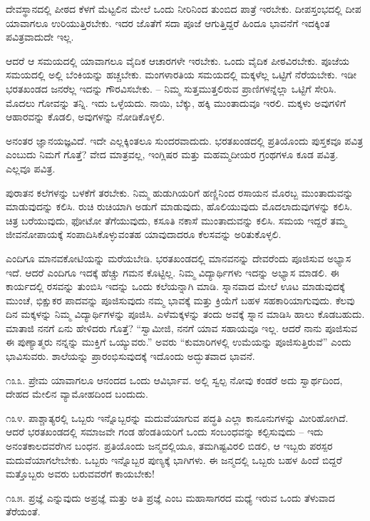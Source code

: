 ದೇವಸ್ಥಾನದಲ್ಲಿ ಪೀಠದ ಕೆಳಗೆ ಮೆಟ್ಟಲಿನ ಮೇಲೆ ಒಂದು ನೀರಿನಿಂದ ತುಂಬಿದ ಪಾತ್ರೆ ಇರಬೇಕು. ದೀಪಸ್ತಂಭದಲ್ಲಿ ದೀಪ ಯಾವಾಗಲೂ ಉರಿಯುತ್ತಿರಬೇಕು. ಇದರ ಜೊತೆಗೆ ಸದಾ ಪೂಜೆ ಆಗುತ್ತಿದ್ದರೆ ಹಿಂದೂ ಭಾವನೆಗೆ ಇದಕ್ಕಿಂತ ಪವಿತ್ರವಾದುದೇ ಇಲ್ಲ.

ಆದರೆ ಆ ಸಮಯದಲ್ಲಿ ಯಾವಾಗಲೂ ವೈದಿಕ ಆಚಾರಗಳೇ ಇರಬೇಕು. ಒಂದು ವೈದಿಕ ಪೀಠವಿರಬೇಕು. ಪೂಜೆಯ ಸಮಯದಲ್ಲಿ ಅಲ್ಲಿ ಬೆಂಕಿಯನ್ನು ಹಚ್ಚಬೇಕು. ಮಂಗಳಾರತಿಯ ಸಮಯದಲ್ಲಿ ಮಕ್ಕಳೆಲ್ಲ ಒಟ್ಟಿಗೆ ನೆರೆಯಬೇಕು. ಇಡೀ ಭರತಖಂಡದ ಜನರೆಲ್ಲ ಇದನ್ನು ಗೌರವಿಸಬೇಕು. – ನಿಮ್ಮ ಸುತ್ತಮುತ್ತಲಿರುವ ಪ್ರಾಣಿಗಳನ್ನೆಲ್ಲಾ ಒಟ್ಟಿಗೆ ಸೇರಿಸಿ. ಮೊದಲು ಗೋವನ್ನು ತನ್ನಿ. ಇದು ಒಳ್ಳೆಯದು. ನಾಯಿ, ಬೆಕ್ಕು, ಹಕ್ಕಿ ಮುಂತಾದುವೂ ಇರಲಿ. ಮಕ್ಕಳು ಅವುಗಳಿಗೆ ಆಹಾರವನ್ನು ಕೊಡಲಿ, ಅವುಗಳನ್ನು ನೋಡಿಕೊಳ್ಳಲಿ.

ಅನಂತರ ಜ್ಞಾನಯಜ್ಞವಿದೆ. ಇದೇ ಎಲ್ಲಕ್ಕಿಂತಲೂ ಸುಂದರವಾದುದು. ಭರತಖಂಡದಲ್ಲಿ ಪ್ರತಿಯೊಂದು ಪುಸ್ತಕವೂ ಪವಿತ್ರ ಎಂಬುದು ನಿಮಗೆ ಗೊತ್ತೆ? ವೇದ ಮಾತ್ರವಲ್ಲ, ಇಂಗ್ಲಿಷರ ಮತ್ತು ಮಹಮ್ಮದೀಯರ ಗ್ರಂಥಗಳೂ ಕೂಡ ಪವಿತ್ರ. ಎಲ್ಲವೂ ಪವಿತ್ರ.

ಪುರಾತನ ಕಲೆಗಳನ್ನು ಬಳಕೆಗೆ ತರಬೇಕು. ನಿಮ್ಮ ಹುಡುಗಿಯರಿಗೆ ಹಣ್ಣಿನಿಂದ ರಸಾಯನ ಮೊರಬ್ಬ ಮುಂತಾದುವನ್ನು ಮಾಡುವುದನ್ನು ಕಲಿಸಿ. ರುಚಿ ರುಚಿಯಾಗಿ ಅಡುಗೆ ಮಾಡುವುದು, ಹೊಲಿಯುವುದು ಮೊದಲಾದುವುಗಳನ್ನು ಕಲಿಸಿ. ಚಿತ್ರ ಬರೆಯುವುದು, ಫೋಟೋ ತೆಗೆಯುವುದು, ಕಸೂತಿ ನಕಾಸೆ ಮುಂತಾದುವನ್ನು ಕಲಿಸಿ. ಸಮಯ ಇದ್ದರೆ ತಮ್ಮ ಜೀವನೋಪಾಯಕ್ಕೆ ಸಂಪಾದಿಸಿಕೊಳ್ಳುವಂತಹ ಯಾವುದಾದರೂ ಕೆಲಸವನ್ನು ಅರಿತುಕೊಳ್ಳಲಿ.

ಎಂದಿಗೂ ಮಾನವಕೋಟಿಯನ್ನು ಮರೆಯಬೇಡಿ. ಭರತಖಂಡದಲ್ಲಿ ಮಾನವನನ್ನು ದೇವರೆಂದು ಪೂಜಿಸುವ ಅಭ್ಯಾಸ ಇದೆ. ಆದರೆ ಎಂದಿಗೂ ಇದಕ್ಕೆ ಹೆಚ್ಚು ಗಮನ ಕೊಟ್ಟಿಲ್ಲ. ನಿಮ್ಮ ವಿದ್ಯಾರ್ಥಿಗಳು ಇದನ್ನು ಅಭ್ಯಾಸ ಮಾಡಲಿ. ಈ ಕಾರ್ಯದಲ್ಲಿ ರಸವನ್ನು ತುಂಬಿಸಿ ಇದನ್ನು ಒಂದು ಕಲೆಯನ್ನಾಗಿ ಮಾಡಿ. ಸ್ನಾನವಾದ ಮೇಲೆ ಊಟ ಮಾಡುವುದಕ್ಕೆ ಮುಂಚೆ, ಭಿಕ್ಷುಕರ ಪಾದವನ್ನು ಪೂಜಿಸುವುದು ನಮ್ಮ ಭಾವಕ್ಕೆ ಮತ್ತು ಕ್ರಿಯೆಗೆ ಬಹಳ ಸಹಕಾರಿಯಾಗುವುದು. ಕೆಲವು ದಿನ ಮಕ್ಕಳನ್ನು ನಿಮ್ಮ ವಿದ್ಯಾರ್ಥಿಗಳನ್ನು ಪೂಜಿಸಿ. ಎಳೆಮಕ್ಕಳನ್ನು ತಂದು ಅವಕ್ಕೆ ಸ್ನಾನ ಮಾಡಿಸಿ ಹಾಲು ಕೊಡಬಹುದು. ಮಾತಾಜಿ ನನಗೆ ಏನು ಹೇಳಿದರು ಗೊತ್ತೆ? “ಸ್ವಾಮೀಜಿ, ನನಗೆ ಯಾವ ಸಹಾಯವೂ ಇಲ್ಲ. ಆದರೆ ನಾನು ಪೂಜಿಸುವ ಈ ಪುಣ್ಯಾತ್ಮರು ನನ್ನನ್ನು ಮುಕ್ತಿಗೆ ಒಯ್ಯುವರು.” ಅವರು “ಕುಮಾರಿಗಳಲ್ಲಿ ಉಮೆಯನ್ನು ಪೂಜಿಸುತ್ತಿರುವೆ” ಎಂದು ಭಾವಿಸುವರು. ಶಾಲೆಯನ್ನು ಪ್ರಾರಂಭಿಸುವುದಕ್ಕೆ ಇದೊಂದು ಅದ್ಭುತವಾದ ಭಾವನೆ.

೧೩೩. ಪ್ರೇಮ ಯಾವಾಗಲೂ ಆನಂದದ ಒಂದು ಆವಿರ್ಭಾವ. ಅಲ್ಲಿ ಸ್ವಲ್ಪ ನೋವು ಕಂಡರೆ ಅದು ಸ್ವಾರ್ಥದಿಂದ, ದೇಹದ ಮೇಲಿನ ವ್ಯಾಮೋಹದಿಂದ ಬಂದುದು.

೧೩೪. ಪಾಶ್ಚಾತ್ಯರಲ್ಲಿ ಒಬ್ಬರು ಇನ್ನೊಬ್ಬರನ್ನು ಮದುವೆಯಾಗುವ ಪದ್ಧತಿ ಎಲ್ಲಾ ಕಾನೂನುಗಳನ್ನು ಮೀರಿಹೋಗಿದೆ. ಆದರೆ ಭರತಖಂಡದಲ್ಲಿ ಸಮಾಜವೇ ಗಂಡ ಹೆಂಡತಿಯರಿಗೆ ಒಂದು ಸಂಬಂಧವನ್ನು ಕಲ್ಪಿಸುವುದು – ಇದು ಅನಂತಕಾಲದವರೆಗಿನ ಬಂಧನ. ಪ್ರತಿಯೊಂದು ಜನ್ಮದಲ್ಲಿಯೂ, ತಮಗಿಷ್ಟವಿರಲಿ ಬಿಡಲಿ, ಆ ಇಬ್ಬರು ಪರಸ್ಪರ ಮದುವೆಯಾಗಲೇಬೇಕು. ಒಬ್ಬರು ಇನ್ನೊಬ್ಬರ ಪುಣ್ಯಕ್ಕೆ ಭಾಗಿಗಳು. ಈ ಜನ್ಮದಲ್ಲಿ ಒಬ್ಬರು ಬಹಳ ಹಿಂದೆ ಬಿದ್ದರೆ ಮತ್ತೊಬ್ಬರು ಅವರು ಬರುವವರೆಗೆ ಕಾಯಬೇಕು!

೧೩೫. ಪ್ರಜ್ಞೆ ಎನ್ನುವುದು ಅಪ್ರಜ್ಞೆ  ಮತ್ತು ಅತಿ ಪ್ರಜ್ಞೆ  ಎಂಬ ಮಹಾಸಾಗರದ ಮಧ್ಯೆ ಇರುವ ಒಂದು ತೆಳುವಾದ ತೆರೆಯಂತೆ.

